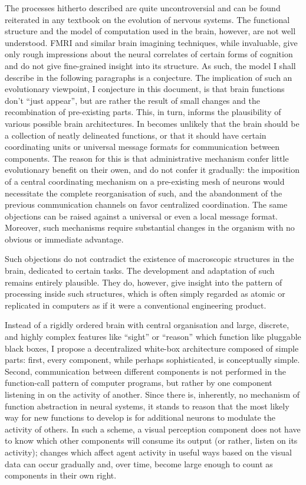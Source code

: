 The processes hitherto described are quite uncontroversial and can be found reiterated in any textbook on the evolution of nervous systems. The functional structure and the model of computation used in the brain, however, are not well understood. FMRI and similar brain imagining techniques, while invaluable, give only rough impressions about the neural correlates of certain forms of cognition and do not give fine-grained insight into its structure. As such, the model I shall describe in the following paragraphs is a conjecture. The implication of such an evolutionary viewpoint, I conjecture in this document, is that brain functions don't ``just appear'', but are rather the result of small changes and the recombination of pre-existing parts. This, in turn, informs the plausibility of various possible brain architectures. In becomes unlikely that the brain should be a collection of neatly delineated functions, or that it should have certain coordinating units or universal message formats for communication between components. The reason for this is that administrative mechanism confer little evolutionary benefit on their owen, and do not confer it gradually: the imposition of a central coordinating mechanism on a pre-existing mesh of neurons would necessitate the complete reorganisation of such, and the abandonment of the previous communication channels on favor centralized coordination. The same objections can be raised against a universal or even a local message format. Moreover, such mechanisms require substantial changes in the organism with no obvious or immediate advantage.

Such objections do not contradict the existence of macroscopic structures in the brain, dedicated to certain tasks. The development and adaptation of such remains entirely plausible. They do, however, give insight into the pattern of processing inside such structures, which is often simply regarded as atomic or replicated in computers as if it were a conventional engineering product.

Instead of a rigidly ordered brain with central organisation and large, discrete, and highly complex features like ``sight'' or ``reason'' which function like pluggable black boxes, I propose a decentralized white-box architecture composed of simple parts: first, every component, while perhaps sophisticated, is conceptually simple. Second, communication between different components is not performed in the function-call pattern of computer programs, but rather by one component listening in on the activity of another. Since there is, inherently, no mechanism of function abstraction in neural systems, it stands to reason that the most likely way for new functions to develop is for additional neurons to modulate the activity of others. In such a scheme, a visual perception component does not have to know which other components will consume its output (or rather, listen on its activity); changes which affect agent activity in useful ways based on the visual data can occur gradually and, over time, become large enough to count as components in their own right.

